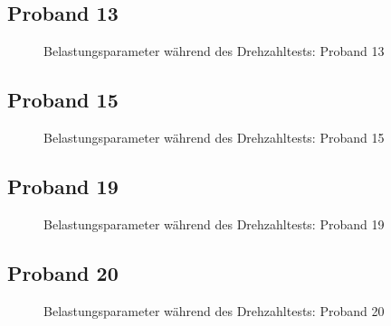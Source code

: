 \documentclass[
  letterpaper,
  DIV=11]{scrartcl}
\begin{document}
\subsection{Proband 13}

\begin{figure}


\caption{\label{fig-DT_13}Belastungsparameter während des Drehzahltests:
Proband 13}

\end{figure}%

\subsection{Proband 15}

\begin{figure}


\caption{\label{fig-DT_15}Belastungsparameter während des Drehzahltests:
Proband 15}

\end{figure}%

\subsection{Proband 19}

\begin{figure}


\caption{\label{fig-DT_19}Belastungsparameter während des Drehzahltests:
Proband 19}

\end{figure}%

\subsection{Proband 20}

\begin{figure}


\caption{\label{fig-DT_20}Belastungsparameter während des Drehzahltests:
Proband 20}

\end{figure}%
\end{document}
